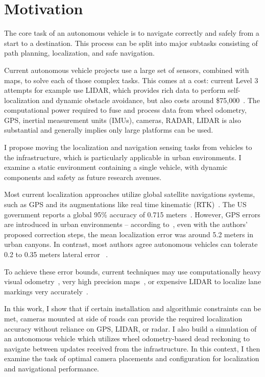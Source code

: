 \documentclass[a4paper,12pt,twoside,openright]{report}
\begin{document}
\section{Motivation}

The core task of an autonomous vehicle is to navigate correctly and safely from a start
to a destination. This process can be split into major subtasks consisting
of path planning, localization, and safe navigation.

Current autonomous vehicle projects use a large set of sensors, combined with
maps, to solve each of those complex tasks. This comes at a cost: current
Level 3 attempts for example use LIDAR, which 
provides rich data to perform self-localization and dynamic obstacle avoidance,
but also costs around \$75,000~\cite{lin2018architectural}. The computational
power required to fuse and process data from wheel odometry,
GPS, inertial measurement units (IMUs), cameras, RADAR, LIDAR is also substantial
and generally implies only large platforms can be used.

I propose moving the localization and navigation sensing tasks
from vehicles to the infrastructure, which is particularly applicable in urban environments.
I examine a static environment containing a single vehicle, with dynamic components and safety
as future research avenues.

Most current localization approaches utilize global satellite navigations systems,
such as GPS and its augmentations like real time kinematic (RTK)~\cite{scherzinger2000precise}.
The US government reports a global 95\% accuracy of 0.715 meters~\cite{USGPSPerformance}. 
However, GPS errors are introduced in urban environments -- according to~\citeauthor{miura2015gps}, even with the
authors' proposed correction steps, the mean localization error was around 5.2 meters in urban canyons. 
In contrast, most authors agree autonomous vehicles can tolerate 0.2 to 0.35 meters lateral error
~\cite{vivacqua2017low}\cite{ziegler2014video}\cite{mattern2010high}.

To achieve these error bounds, current techniques may use computationally heavy visual odometry~\cite{ziegler2014video},
very high precision maps~\cite{mattern2010high}, or expensive LIDAR to localize
lane markings very accurately~\cite{hata2014road}.  

In this work, I show that if certain installation and algorithmic constraints
can be met, cameras mounted at side of roads can provide the required localization
accuracy without reliance on GPS, LIDAR, or radar. I also build a simulation
of an autonomous vehicle which utilizes wheel odometry-based dead reckoning 
to navigate between updates received from the infrastructure. In this context,
I then examine the task of optimal camera placements and configuration for localization and navigational performance.
\end{document}
